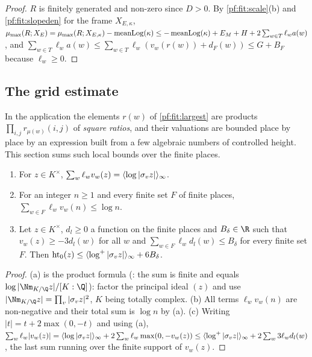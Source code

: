 \begin{proof}
$R$ is finitely generated and non-zero since $D>0$. By \cref{pf:fit:scale}(b) and \cref{pf:fit:slopeden} for the frame
$X_{E,\kappa}$,
$\mu_{\max}(R;X_E)=\mu_{\max}(R;X_{E,\kappa})-\operatorname{meanLog}(\kappa)\le-\operatorname{meanLog}(\kappa)+E_M+H+2\sum_{w\in T}\ell_wa(w)$, and
$\sum_{w\in T}\ell_wa(w)\le\sum_{w\in T}\ell_w(v_w(r(w))+d_F(w))\le G+B_F$ because $\ell_w\ge0$.
\end{proof}

\subsection{The grid estimate}\label{sec:pf:fit:grid}

In the application the elements $r(w)$ of \cref{pf:fit:largest} are products $\prod_{i,j}r_{\mu(w)}(i,j)$ of
\emph{square ratios}, and their valuations are bounded place by place by an expression built from a few algebraic
numbers of controlled height. This section sums such local bounds over the finite places.

\begin{lemma}\label{pf:fit:prodformula}
\begin{enumerate}[label=(\alph*)]
\item For $z\in K^\times$, $\sum_w\ell_wv_w(z)=\langle \log|\sigma_vz|\rangle_{\infty}$.
\item For an integer $n\ge1$ and every finite set $F$ of finite places, $\sum_{w\in F}\ell_wv_w(n)\le\log n$.
\item Let $z\in K^\times$, $d_l\ge0$ a function on the finite places and $B_\delta\in\R$ such that
$v_w(z)\ge-3d_l(w)$ for all $w$ and $\sum_{w\in F}\ell_wd_l(w)\le B_\delta$ for every finite set $F$. Then
$\operatorname{ht}_0(z)\le\langle \log^+|\sigma_vz|\rangle_{\infty}+6B_\delta$.
\end{enumerate}
\end{lemma}

\begin{proof}
(a) is the product formula (: the sum is finite and equals
$\log|\Nm_{K/\Q}z|/[K:\Q]$): factor the principal ideal $(z)$ and use $|\Nm_{K/\Q}z|=\prod_v|\sigma_vz|^2$, $K$ being
totally complex. (b) All terms $\ell_wv_w(n)$ are non-negative and their total sum is $\log n$ by (a). (c) Writing
$|t|=t+2\max(0,-t)$ and using (a),
$\sum_w\ell_w|v_w(z)|=\langle \log|\sigma_vz|\rangle_{\infty}+2\sum_w\ell_w\max(0,-v_w(z))\le\langle \log^+|\sigma_vz|\rangle_{\infty}
+2\sum_{w}3\ell_wd_l(w)$, the last sum running over the finite support of $v_w(z)$.
\end{proof}

